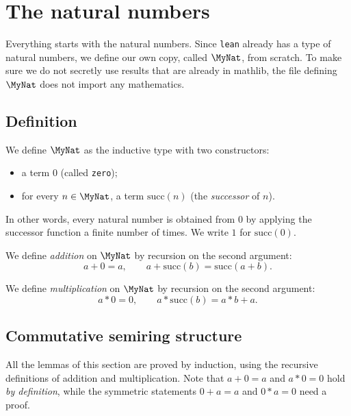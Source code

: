 \chapter{The natural numbers}

Everything starts with the natural numbers. Since \texttt{lean} already has a type of natural
numbers, we define our own copy, called $\MyNat$, from scratch. To make sure we do not secretly use
results that are already in mathlib, the file defining $\MyNat$ does not import any mathematics.

\section{Definition}

\begin{definition}
    \label{MyNat}
    \leanok
    We define $\MyNat$ as the inductive type with two constructors:
    \begin{itemize}
        \item a term $0$ (called \texttt{zero});
        \item for every $n \in \MyNat$, a term $\mathrm{succ}(n)$ (the \emph{successor} of $n$).
    \end{itemize}
    In other words, every natural number is obtained from $0$ by applying the successor function a
    finite number of times. We write $1$ for $\mathrm{succ}(0)$.
\end{definition}

\begin{definition}
    \label{MyNat.add}
    \leanok
    We define \emph{addition} on $\MyNat$ by recursion on the second argument:
    \[
    a + 0 = a, \qquad a + \mathrm{succ}(b) = \mathrm{succ}(a + b).
    \]
\end{definition}

\begin{definition}
    \label{MyNat.mul}
    \leanok
    We define \emph{multiplication} on $\MyNat$ by recursion on the second argument:
    \[
    a * 0 = 0, \qquad a * \mathrm{succ}(b) = a * b + a.
    \]
\end{definition}

\section{Commutative semiring structure}

All the lemmas of this section are proved by induction, using the recursive definitions of addition
and multiplication. Note that $a + 0 = a$ and $a * 0 = 0$ hold \emph{by definition}, while the
symmetric statements $0 + a = a$ and $0 * a = 0$ need a proof.

